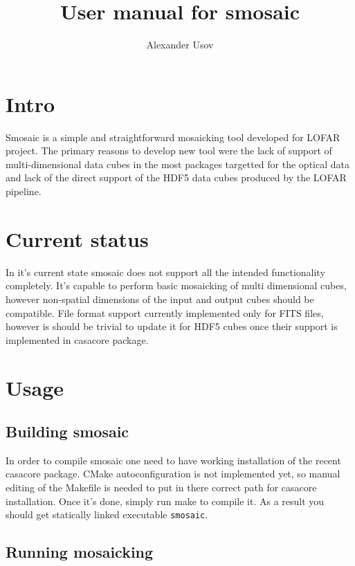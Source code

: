 \documentclass[12pt]{article}
\begin{document}
\title{User manual for smosaic}
\author{Alexander Usov}
\maketitle

\section{Intro}

Smosaic is a simple and straightforward mosaicking tool developed 
for LOFAR project. The primary reasons to develop new tool were the
lack of support of multi-dimensional data cubes in the most packages
targetted for the optical data and  lack of the direct support of 
the HDF5 data cubes produced by the LOFAR pipeline.

\section{Current status}

In it's current state smosaic does not support all the intended 
functionality completely. It's capable to perform basic mosaicking 
of multi dimensional cubes, however non-spatial dimensions of the
input and output cubes should be compatible. File format support
currently implemented only for FITS files, however is should be trivial
to update it for HDF5 cubes once their support is implemented in 
casacore package.

\section{Usage}

\subsection{Building smosaic}

In order to compile smosaic one need to have working installation of the
recent casacore package. CMake autoconfiguration is not implemented yet,
so manual editing of the Makefile is needed to put in there correct path 
for casacore installation. Once it's done, simply run make to compile it.
As a result you should get statically linked executable \verb/smosaic/.

\subsection{Running mosaicking}
\end{document}
